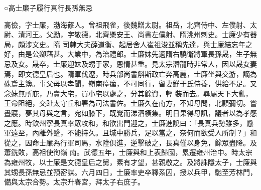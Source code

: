
\begin{pinyinscope}

 ○高士廉子履行真行長孫無忌



 高儉，字士廉，渤海蓚人。曾祖飛雀，後魏贈太尉。祖岳，北齊侍中、左僕射、太尉、清河王。父勵，字敬德，北齊樂安王、尚書左僕射、隋洮州刺史。士廉少有器局，頗涉文史。隋
 司隸大夫薛道衡、起居舍人崔祖浚並稱先達，與士廉結忘年之好，由是公卿藉甚。大業中，為治禮郎。士廉妹先適隋右驍衛將軍長孫晟，生子無忌及女。晟卒，士廉迎妹及甥于家，恩情甚重。見太宗潛龍時非常人，因以晟女妻焉，即文德皇后也。隋軍伐遼，時兵部尚書斛斯政亡奔高麗，士廉坐與交游，謫為硃鳶主簿。事父母以孝聞，嶺南瘴癘，不可同行，留妻鮮于氏侍養，供給不足。又念妹無所庇，乃賣大宅，買小宅以處之，分其餘資，輕
 裝而去。尋屬天下大亂，王命阻絕，交趾太守丘和署為司法書佐。士廉久在南方，不知母問，北顧彌切。嘗晝寢，夢其母與之言，宛如膝下，既覺而涕泗橫集。明日果得母訊，議者以為孝感之應。時欽州寧長真率眾攻和，和欲出門迎之，士廉進說曰：「長真兵勢雖多，懸軍遠至，內離外蹙，不能持久。且城中勝兵，足以當之，奈何而欲受人所制？」和從之，因命士廉為行軍司馬，水陸俱進，逆擊破之，長真僅以身免，餘眾盡降。及蕭銑敗，高祖使徇嶺
 南。武德五年，士廉與和上表歸國，累遷雍州治中。時太宗為雍州牧，以士廉是文德皇后之舅，素有才望，甚親敬之。及將誅隱太子，士廉與其甥長孫無忌並預密謀。六月四日，士廉率吏卒釋系囚，授以兵甲，馳至芳林門，備與太宗合勢。太宗升春宮，拜太子右庶子。




\end{pinyinscope}
